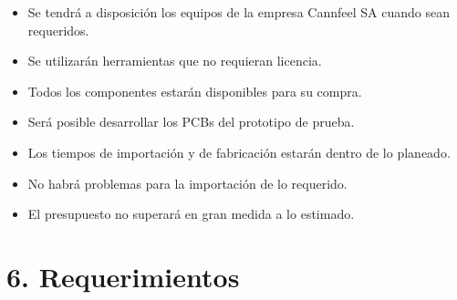 \documentclass[
11pt, %
codirector, %
]{charter}
\begin{document}
\begin{itemize}
	\item Se tendrá a disposición los equipos de la empresa Cannfeel SA cuando sean requeridos.
	\item Se utilizarán herramientas que no requieran licencia.
	\item Todos los componentes estarán disponibles para su compra.
	\item Será posible desarrollar los PCBs del prototipo de prueba.
	\item Los tiempos de importación y de fabricación estarán dentro de lo planeado.
	\item No habrá problemas para la importación de lo requerido.
	\item El presupuesto no superará en gran medida a lo estimado.
\end{itemize}


\section{6. Requerimientos}
\label{sec:requerimientos}
\end{document}
